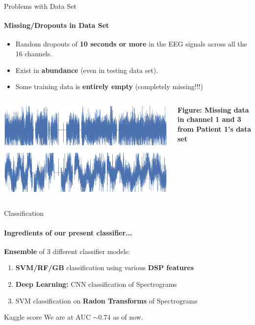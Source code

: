 \documentclass{beamer}
\begin{document}
\begin{frame}{Problems with Data Set}
  \framesubtitle{Missing/Dropouts in Data Set}

  \begin{block}{}
    \begin{itemize}
    \item Random dropouts of \textbf{10 seconds or more} in the EEG signals across all the 16 channels.
    \item Exist in \textbf{abundance} (even in testing data set).
    \item Some training data is \textbf{entirely empty} (completely missing!!!)
    \end{itemize}
  \end{block}

  \begin{columns}
    \includegraphics[scale=0.13]{img/data_drops2.eps}

    \textbf{Figure: Missing data in channel 1 and 3 from Patient 1's data set}
  \end{columns}
\end{frame}

\begin{frame}{Classification}
  \framesubtitle{Ingredients of our present classifier...}

  \textbf{Ensemble} of 3 different classifier models:
  
  \begin{enumerate}
  \item \textbf{SVM/RF/GB} classification using various \textbf{DSP features}
  \item \textbf{Deep Learning:} CNN classification of Spectrograms
  \item SVM classification on \textbf{Radon Transforms} of Spectrograms
  \end{enumerate}

  \pause
  \begin{block}{Kaggle score}
    We are at AUC $\boldsymbol{\sim 0.74}$ as of now.
  \end{block}
\end{frame}
\end{document}

